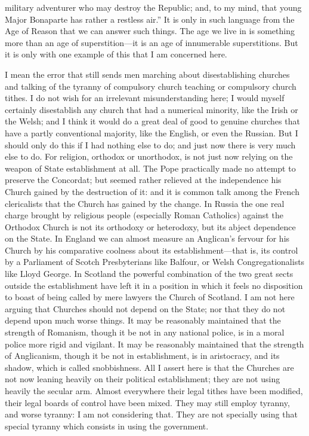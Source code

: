 \documentclass{book}
\begin{document}
military adventurer who may destroy the Republic; and, to my mind, that young Major Bonaparte has rather a restless air.” It is only in such language from the Age of Reason that we can answer such things. The age we live in is something more than an age of superstition—it is an age of innumerable superstitions. But it is only with one example of this that I am concerned here.

I mean the error that still sends men marching about disestablishing churches and talking of the tyranny of compulsory church teaching or compulsory church tithes. I do not wish for an irrelevant misunderstanding here; I would myself certainly disestablish any church that had a numerical minority, like the Irish or the Welsh; and I think it would do a great deal of good to genuine churches that have a partly conventional majority, like the English, or even the Russian. But I should only do this if I had nothing else to do; and just now there is very much else to do. For religion, orthodox or unorthodox, is not just now relying on the weapon of State establishment at all. The Pope practically made no attempt to preserve the Concordat; but seemed rather relieved at the independence his Church gained by the destruction of it: and it is common talk among the French clericalists that the Church has gained by the change. In Russia the one real charge brought by religious people (especially Roman Catholics) against the Orthodox Church is not its orthodoxy or heterodoxy, but its abject dependence on the State. In England we can almost measure an Anglican’s fervour for his Church by his comparative coolness about its establishment—that is, its control by a Parliament of Scotch Presbyterians like Balfour, or Welsh Congregationalists like Lloyd George. In Scotland the powerful combination of the two great sects outside the establishment have left it in a position in which it feels no disposition to boast of being called by mere lawyers the Church of Scotland. I am not here arguing that Churches should not depend on the State; nor that they do not depend upon much worse things. It may be reasonably maintained that the strength of Romanism, though it be not in any national police, is in a moral police more rigid and vigilant. It may be reasonably maintained that the strength of Anglicanism, though it be not in establishment, is in aristocracy, and its shadow, which is called snobbishness. All I assert here is that the Churches are not now leaning heavily on their political establishment; they are not using heavily the secular arm. Almost everywhere their legal tithes have been modified, their legal boards of control have been mixed. They may still employ tyranny, and worse tyranny: I am not considering that. They are not specially using that special tyranny which consists in using the government.
\end{document}
